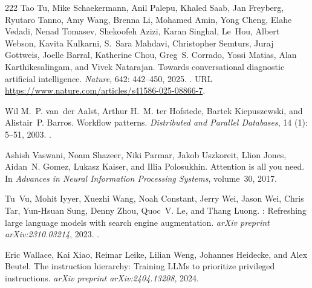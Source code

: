 \begin{thebibliography}{222}
Tao Tu, Mike Schaekermann, Anil Palepu, Khaled Saab, Jan Freyberg, Ryutaro
  Tanno, Amy Wang, Brenna Li, Mohamed Amin, Yong Cheng, Elahe Vedadi, Nenad
  Tomasev, Shekoofeh Azizi, Karan Singhal, Le~Hou, Albert Webson, Kavita
  Kulkarni, S.~Sara Mahdavi, Christopher Semturs, Juraj Gottweis, Joelle
  Barral, Katherine Chou, Greg~S. Corrado, Yossi Matias, Alan Karthikesalingam,
  and Vivek Natarajan.
\newblock Towards conversational diagnostic artificial intelligence.
\newblock \emph{Nature}, 642: 442--450, 2025.
\newblock {}.
\newblock URL \url{https://www.nature.com/articles/s41586-025-08866-7}.

Wil M.~P. van~der Aalst, Arthur H.~M. ter Hofstede, Bartek Kiepuszewski, and
  Alistair~P. Barros.
\newblock Workflow patterns.
\newblock \emph{Distributed and Parallel Databases}, 14 (1):
  5--51, 2003.
\newblock {}.

Ashish Vaswani, Noam Shazeer, Niki Parmar, Jakob Uszkoreit, Llion Jones,
  Aidan~N. Gomez, Lukasz Kaiser, and Illia Polosukhin.
\newblock Attention is all you need.
\newblock In \emph{Advances in Neural Information Processing Systems},
  volume~30, 2017.

Tu~Vu, Mohit Iyyer, Xuezhi Wang, Noah Constant, Jerry Wei, Jason Wei, Chris
  Tar, Yun-Hsuan Sung, Denny Zhou, Quoc~V. Le, and Thang Luong.
: Refreshing large language models with search engine
  augmentation.
\newblock \emph{arXiv preprint arXiv:2310.03214}, 2023.
\newblock {}.

Eric Wallace, Kai Xiao, Reimar Leike, Lilian Weng, Johannes Heidecke, and Alex
  Beutel.
\newblock The instruction hierarchy: Training {LLM}s to prioritize privileged
  instructions.
\newblock \emph{arXiv preprint arXiv:2404.13208}, 2024.


\end{thebibliography}
